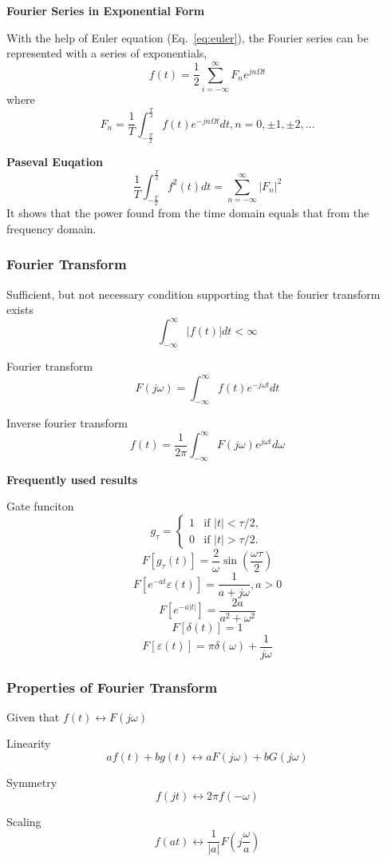  {\bf Fourier Series in Exponential Form}
 
 With the help of Euler equation (Eq.~\ref{eq:euler}), the Fourier series can be represented with
 a series of exponentials,
 \[ f(t) = \frac{1}{2} \sum_{i=-\infty}^\infty F_n e^{jn\Omega t}\]
 where
 \[ F_n = \frac{1}{T} \int_{-\frac{T}{2}}^{\frac{T}{2}} f(t) e^{-jn\Omega t}dt, n=0,\pm 1, \pm2, \ldots\]

 {\bf Paseval Euqation}\\
 \[ \frac{1}{T} \int_{-\frac{T}{2}}^{\frac{T}{2}} f^2(t)dt = \sum_{n=-\infty}^\infty |F_n|^2\]
 It shows that the power found from the time domain equals that from the frequency domain.

 \subsubsection{Fourier Transform}
 Sufficient, but not necessary condition supporting that the fourier transform exists
 \[ \int_{-\infty}^\infty |f(t)|dt < \infty\]

 Fourier transform
 \[ F(j\omega) = \int_{-\infty}^\infty f(t) e^{-j\omega t} dt\]

 Inverse fourier transform
 \[ f(t) = \frac{1}{2\pi} \int_{-\infty}^{\infty} F(j\omega)e^{j\omega t} d\omega\]

 {\bf Frequently used results}

 Gate funciton
 \[ g_\tau = \left\{ \begin{array}{rl}
			 1 & \text{if } |t| < \tau/2, \\
			 0 & \text{if } |t| > \tau/2.
		 \end{array} \right.
 \]
 \[ \mathit{F}[g_\tau (t)] = \frac{2}{\omega} \sin(\frac{\omega \tau}{2})\]
 \[ \mathit{F}[e^{-at}\varepsilon(t)] = \frac{1}{a + j\omega} , a > 0 \]
 \[ \mathit{F}[e^{-a|t|}] = \frac{2a}{a^2 + \omega^2}\]
 \[ \mathit{F}[\delta(t)]  = 1\]
 \[ \mathit{F}[\varepsilon(t)] = \pi \delta(\omega) + \frac{1}{j\omega}\]

 \subsubsection{Properties of Fourier Transform}
 Given that $f(t) \leftrightarrow F(j\omega)$

 Linearity
 \[ a f(t) + b g(t) \leftrightarrow a F(j\omega) + b G(j\omega)\]

 Symmetry
 \[ f(jt) \leftrightarrow 2\pi f(-\omega)\]

 Scaling
 \[ f(at) \leftrightarrow \frac{1}{|a|}F(j\frac{\omega}{a})\]

